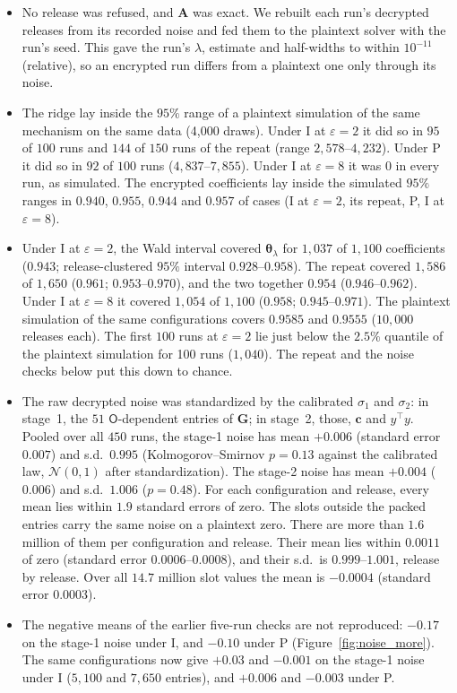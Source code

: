 \documentclass[11pt]{article}
\theoremstyle{definition}
\theoremstyle{plain}
\newcommand{\btheta}{\boldsymbol{\theta}}
\newcommand{\bA}{\mathbf{A}}
\newcommand{\bc}{\mathbf{c}}
\newcommand{\bG}{\mathbf{G}}
\newcommand{\Party}[1]{\textsf{#1}}
\newcommand{\Op}{\Party{O}}
\begin{document}
\begin{itemize}[noitemsep]
  \item No release was refused, and $\bA$ was exact. We rebuilt each run's decrypted releases from its recorded noise and fed them to the plaintext solver with the run's seed. This gave the run's $\lambda$, estimate and half-widths to within $10^{-11}$ (relative), so an encrypted run differs from a plaintext one only through its noise.
  \item The ridge lay inside the $95\%$ range of a plaintext simulation of the same mechanism on the same data (4{,}000 draws). Under I at $\varepsilon = 2$ it did so in $95$ of $100$ runs and $144$ of $150$ runs of the repeat (range $2{,}578$--$4{,}232$). Under P it did so in $92$ of $100$ runs ($4{,}837$--$7{,}855$). Under I at $\varepsilon = 8$ it was $0$ in every run, as simulated. The encrypted coefficients lay inside the simulated $95\%$ ranges in $0.940$, $0.955$, $0.944$ and $0.957$ of cases (I at $\varepsilon = 2$, its repeat, P, I at $\varepsilon = 8$).
  \item Under I at $\varepsilon = 2$, the Wald interval covered $\btheta_\lambda$ for $1{,}037$ of $1{,}100$ coefficients ($0.943$; release-clustered $95\%$ interval $0.928$--$0.958$). The repeat covered $1{,}586$ of $1{,}650$ ($0.961$; $0.953$--$0.970$), and the two together $0.954$ ($0.946$--$0.962$). Under I at $\varepsilon = 8$ it covered $1{,}054$ of $1{,}100$ ($0.958$; $0.945$--$0.971$). The plaintext simulation of the same configurations covers $0.9585$ and $0.9555$ ($10{,}000$ releases each). The first $100$ runs at $\varepsilon = 2$ lie just below the $2.5\%$ quantile of the plaintext simulation for 100 runs ($1{,}040$). The repeat and the noise checks below put this down to chance.
  \item The raw decrypted noise was standardized by the calibrated $\sigma_1$ and $\sigma_2$: in stage~1, the $51$ $\Op$-dependent entries of $\bG$; in stage~2, those, $\bc$ and $y^\top y$. Pooled over all $450$ runs, the stage-1 noise has mean $+0.006$ (standard error $0.007$) and s.d.\ $0.995$ (Kolmogorov--Smirnov $p = 0.13$ against the calibrated law, $\mathcal N(0, 1)$ after standardization). The stage-2 noise has mean $+0.004$ ($0.006$) and s.d.\ $1.006$ ($p = 0.48$). For each configuration and release, every mean lies within $1.9$ standard errors of zero. The slots outside the packed entries carry the same noise on a plaintext zero. There are more than $1.6$ million of them per configuration and release. Their mean lies within $0.0011$ of zero (standard error $0.0006$--$0.0008$), and their s.d.\ is $0.999$--$1.001$, release by release. Over all $14.7$ million slot values the mean is $-0.0004$ (standard error $0.0003$).
  \item The negative means of the earlier five-run checks are not reproduced: $-0.17$ on the stage-1 noise under I, and $-0.10$ under P (Figure~\ref{fig:noise_more}). The same configurations now give $+0.03$ and $-0.001$ on the stage-1 noise under I ($5{,}100$ and $7{,}650$ entries), and $+0.006$ and $-0.003$ under P.
\end{itemize}
\end{document}
